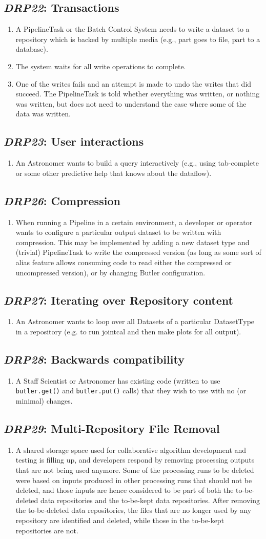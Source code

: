 \documentclass[DM,toc,lsstdraft]{lsstdoc}
\newcommand{\usecase}[3]{%
\subsection{\emph{#1}: #2}
\label{use:#1}
\begin{enumerate}[label=\alph*.]
#3
\end{enumerate}
}
\begin{document}
\usecase{DRP22}{Transactions}{%

\item
A PipelineTask or the Batch Control System needs to write a dataset to a repository which is backed by multiple media (e.g., part goes to file, part to a database).

\item
The system waits for all write operations to complete.

\item
One of the writes fails and an attempt is made to undo the writes that did succeed.
The PipelineTask is told whether everything was written, or nothing was written, but does not need to understand the case where some of the data was written.

}

\usecase{DRP23}{User interactions}{%

\item
An Astronomer wants to build a query interactively (e.g., using tab-complete or some other predictive help that knows about the dataflow).
}

\usecase{DRP26}{Compression}{%

\item
When running a Pipeline in a certain environment, a developer or operator wants to configure a particular output dataset to be written with compression.
This may be implemented by adding a new dataset type and (trivial) PipelineTask to write the compressed version (as long as some sort of alias feature allows consuming code to read either the compressed or uncompressed version), or by changing Butler configuration.
}

\usecase{DRP27}{Iterating over Repository content}{%

\item
An Astronomer wants to loop over all Datasets of a particular DatasetType in a repository (e.g. to run jointcal and then make plots for all output).
}

\usecase{DRP28}{Backwards compatibility}{%

\item
A Staff Scientist or Astronomer has existing code (written to use \texttt{butler.get()} and \texttt{butler.put()} calls) that they wish to use with no (or minimal) changes.
}

\usecase{DRP29}{Multi-Repository File Removal}{%

\item
A shared storage space used for collaborative algorithm development and testing is filling up, and developers respond by removing processing outputs that are not being used anymore.
Some of the processing runs to be deleted were based on inputs produced in other processing runs that should not be deleted, and those inputs are hence considered to be part of both the to-be-deleted data repositories and the to-be-kept data repositories.
After removing the to-be-deleted data repositories, the files that are no longer used by any repository are identified and deleted, while those in the to-be-kept repositories are not.
}
\end{document}
